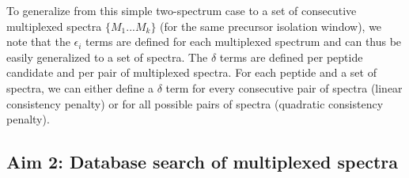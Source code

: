 \documentclass[arial,11pt]{article}
\begin{document}
To generalize from this simple two-spectrum case to a set of consecutive multiplexed spectra $\{M_{1} ... M_{k}\}$ (for the same precursor isolation window), we note that the $\epsilon_{i}$ terms are defined for each multiplexed spectrum and can thus be easily generalized to a set of spectra. The $\delta$ terms are defined per peptide candidate and per pair of multiplexed spectra. For each peptide and a set of spectra, we can either define a $\delta$ term for every consecutive pair of spectra (linear consistency penalty) or for all possible pairs of spectra (quadratic consistency penalty). %


\subsection{Aim 2: Database search of multiplexed spectra}
\end{document}
